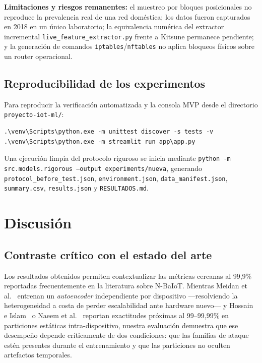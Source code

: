 \documentclass[11pt,a4paper]{article}
\begin{document}
\textbf{Limitaciones y riesgos remanentes:} el muestreo por bloques posicionales no reproduce la prevalencia real de una red doméstica; los datos fueron capturados en 2018 en un único laboratorio; la equivalencia numérica del extractor incremental \texttt{live\_feature\_extractor.py} frente a Kitsune permanece pendiente; y la generación de comandos \texttt{iptables}/\texttt{nftables} no aplica bloqueos físicos sobre un router operacional.

\subsection{Reproducibilidad de los experimentos}
Para reproducir la verificación automatizada y la consola MVP desde el directorio \texttt{proyecto-iot-ml/}:
\begin{verbatim}
.\venv\Scripts\python.exe -m unittest discover -s tests -v
.\venv\Scripts\python.exe -m streamlit run app\app.py
\end{verbatim}
Una ejecución limpia del protocolo riguroso se inicia mediante \texttt{python -m src.models.rigorous --output experiments/nueva}, generando \texttt{protocol\_before\_test.json}, \texttt{environment.json}, \texttt{data\_manifest.json}, \texttt{summary.csv}, \texttt{results.json} y \texttt{RESULTADOS.md}.

\section{Discusión}

\subsection{Contraste crítico con el estado del arte}
Los resultados obtenidos permiten contextualizar las métricas cercanas al 99,9\% reportadas frecuentemente en la literatura sobre N-BaIoT. Mientras Meidan et al.~\cite{meidan2018} entrenan un \textit{autoencoder} independiente por dispositivo ---resolviendo la heterogeneidad a costa de perder escalabilidad ante hardware nuevo--- y Hossain e Islam~\cite{hossain2023} o Naeem et al.~\cite{cnnbilstm2025} reportan exactitudes próximas al 99--99,99\% en particiones estáticas intra-dispositivo, nuestra evaluación demuestra que ese desempeño depende críticamente de dos condiciones: que las familias de ataque estén presentes durante el entrenamiento y que las particiones no oculten artefactos temporales.
\end{document}
